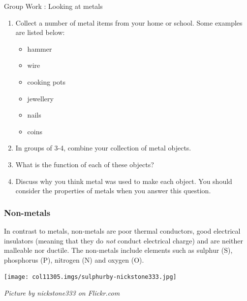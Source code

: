 \label{m38708*secfhsst!!!underscore!!!id320}
            \begin{activity}{Group Work : Looking at metals}{
            \nopagebreak
        \label{m38708*id65869}\begin{enumerate}[noitemsep, label=\textbf{\arabic*}. ] 
            \label{m38708*uid83}\item Collect a number of metal items from your home or school. Some examples are listed below:
\label{m38708*id65885}\begin{itemize}[noitemsep]
            \label{m38708*uid84}\item hammer
\label{m38708*uid85}\item wire
\label{m38708*uid86}\item cooking pots
\label{m38708*uid87}\item jewellery
\label{m38708*uid88}\item nails
\label{m38708*uid89}\item coins
\end{itemize}
        \label{m38708*uid90}\item In groups of 3-4, combine your collection of metal objects.
\label{m38708*uid91}\item What is the function of each of these objects?
\label{m38708*uid92}\item Discuss why you think metal was used to make each object. You should consider the properties of metals when you answer this question.
\end{enumerate}}
\end{activity}
      \label{m38708*uid93}
            \subsubsection{ Non-metals}
            \nopagebreak
\begin{minipage}{.5\textwidth}
        \label{m38708*id66021}In contrast to metals, non-metals are poor thermal conductors, good electrical insulators (meaning that they do \textsl{not} conduct electrical charge) and are neither malleable nor ductile. The non-metals include elements such as sulphur ($\mathrm{S}$), phosphorus ($\mathrm{P}$), nitrogen ($\mathrm{N}$) and oxygen ($\mathrm{O}$).\par 
\end{minipage}
\begin{minipage}{.5\textwidth}
\begin{center}
 \texttt{[image: col11305.imgs/sulphurby-nickstone333.jpg]}\par
\textit{Picture by nickstone333 on Flickr.com}
\end{center}
\end{minipage}
      \label{m38708*uid94}
